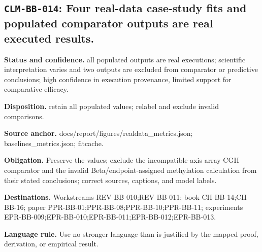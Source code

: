 \subsection[\texttt{CLM-BB-014}]{\texttt{CLM-BB-014}: Four real-data case-study fits and populated comparator outputs are real executed results.}
\textbf{Status and confidence.} all populated outputs are real executions; scientific interpretation varies and two outputs are excluded from comparator or predictive conclusions; high confidence in execution provenance, limited support for comparative efficacy.\par
\textbf{Disposition.} retain all populated values; relabel and exclude invalid comparisons.\par
\textbf{Source anchor.} docs/report/figures/realdata\_metrics.json; baselines\_metrics.json; fitcache.\par
\textbf{Obligation.} Preserve the values; exclude the incompatible-axis array-CGH comparator and the invalid Beta/endpoint-assigned methylation calculation from their stated conclusions; correct sources, captions, and model labels.\par
\textbf{Destinations.} Workstreams REV-BB-010;REV-BB-011; book CH-BB-14;CH-BB-16; paper PPR-BB-01;PPR-BB-08;PPR-BB-10;PPR-BB-11; experiments EPR-BB-009;EPR-BB-010;EPR-BB-011;EPR-BB-012;EPR-BB-013.\par
\textbf{Language rule.} Use no stronger language than is justified by the mapped proof, derivation, or empirical result.


